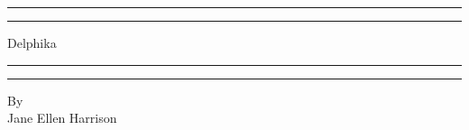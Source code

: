 \documentclass[a4paper, 11pt, oneside, polutonikogreek, english]{article}
\begin{document}
\renewcommand\thefootnote{{\bfseries\color{BrickRed}{\arabic{footnote}}}}
\let\oldfootnote\footnote
    \renewcommand{\footnote}[1]{\oldfootnote{{\normalsize\bfseries\color{BrickRed}#1}}}
\begin{titlepage} %
	\centering %
	\scshape %

	
	\rule{\textwidth}{1.6pt}\vspace*{-\baselineskip}\vspace*{2pt} %
	\rule{\textwidth}{0.4pt} %
	
	\vspace{0.75\baselineskip} %

        {\Huge Delphika \\} %
	
	\vspace{0.75\baselineskip} %
	
	\rule{\textwidth}{0.4pt}\vspace*{-\baselineskip}\vspace{3.2pt} %
	\rule{\textwidth}{1.6pt} %
	
	\vspace{1\baselineskip} %
	
	
	{By \\\Large Jane Ellen Harrison\\} %
	
	\vspace*{1\baselineskip} %
	
	
	
	
		

\end{titlepage}
\end{document}
